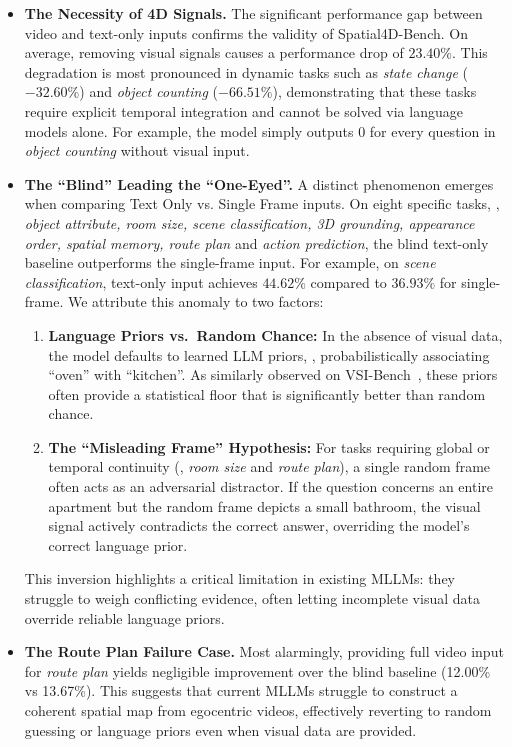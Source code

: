 \begin{itemize}
    \item{
        \textbf{The Necessity of 4D Signals.}
        The significant performance gap between video and text-only inputs confirms the validity of Spatial4D-Bench.
        On average, removing visual signals causes a performance drop of $23.40\%$.
        This degradation is most pronounced in dynamic tasks such as \textit{state change} ($-32.60\%$) and \textit{object counting} ($-66.51\%$), demonstrating that these tasks require explicit temporal integration and cannot be solved via language models alone. For example, the model simply outputs $0$ for every question in \textit{object counting} without visual input.
    }
    \item{
        \textbf{The ``Blind'' Leading the ``One-Eyed''.}
        A distinct phenomenon emerges when comparing Text Only vs. Single Frame inputs.
        On eight specific tasks, \ie, \textit{object attribute, room size, scene classification, 3D grounding, appearance order, spatial memory, route plan} and \textit{action prediction}, the blind text-only baseline outperforms the single-frame input.
        For example, on \textit{scene classification}, text-only input achieves $44.62\%$ compared to $36.93\%$ for single-frame.
        We attribute this anomaly to two factors:
        \begin{enumerate}
            \item {\textbf{Language Priors vs.\ Random Chance:}
            In the absence of visual data, the model defaults to learned LLM priors, \eg, probabilistically associating ``oven'' with ``kitchen''.
            As similarly observed on VSI-Bench~\cite{Yang_2025_CVPR}, these priors often provide a statistical floor that is significantly better than random chance.}
            \item \textbf{The ``Misleading Frame'' Hypothesis:}
            For tasks requiring global or temporal continuity (\eg, \textit{room size} and \textit{route plan}), a single random frame often acts as an adversarial distractor.
            If the question concerns an entire apartment but the random frame depicts a small bathroom, the visual signal actively contradicts the correct answer, overriding the model's correct language prior.
        \end{enumerate}
        This inversion highlights a critical limitation in existing MLLMs: they struggle to weigh conflicting evidence, often letting incomplete visual data override reliable language priors.
    }
    \item{
        \textbf{The Route Plan Failure Case.}
        Most alarmingly, providing full video input for \textit{route plan} yields negligible improvement over the blind baseline (12.00\% vs 13.67\%).
        This suggests that current MLLMs struggle to construct a coherent spatial map from egocentric videos, effectively reverting to random guessing or language priors even when visual data are provided.
    }
\end{itemize}



